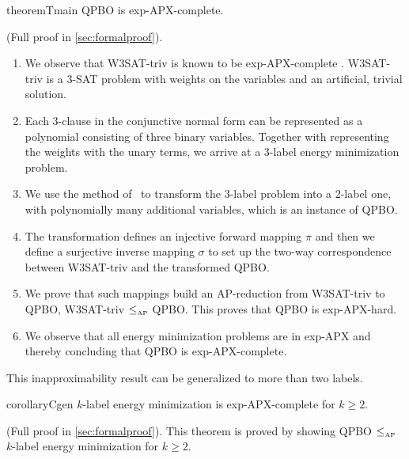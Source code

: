 \begin{restatable}{theorem}{Tmain}\label{th:main}
QPBO is exp-APX-complete.
\end{restatable}
\begin{proofsketch} (Full proof in \cref{sec:formalproof}).
\begin{enumerate}
\item We observe that W3SAT-triv is known to be exp-APX-complete \cite{ausiello1999complexity}. W3SAT-triv is a 3-SAT problem with weights on the variables and an artificial, trivial solution.
\item Each 3-clause in the conjunctive normal form can be represented as a polynomial consisting of three binary variables. Together with representing the weights with the unary terms, we arrive at a 3-label energy minimization problem.
\item We use the method of~\cite{ishikawa2011transformation} to transform the 3-label problem into a 2-label one, with polynomially many additional variables, which is an instance of QPBO.
\item The transformation defines an injective forward mapping $\pi$ and then we define a surjective inverse mapping $\sigma$ to set up the two-way correspondence between W3SAT-triv and the transformed QPBO.
\item We prove that such mappings build an AP-reduction from W3SAT-triv to QPBO, \ie W3SAT-triv $\mathbin{{\leq}_{\text{\tiny AP}}}$ QPBO. This proves that QPBO is exp-APX-hard.
\item We observe that all energy minimization problems are in exp-APX and thereby concluding that QPBO is exp-APX-complete.
\end{enumerate}
\end{proofsketch}

This inapproximability result can be generalized to more than two labels.
\begin{restatable}{corollary}{Cgen}\label{C:gen}
$k$-label energy minimization is exp-APX-complete for $k \geq 2$.
\end{restatable}
%
\begin{proofsketch}
(Full proof in \cref{sec:formalproof}). This theorem is proved by showing QPBO $ \mathbin{{\leq}_{\text{\tiny AP}}}$ $k$-label energy minimization for $k \geq 2$.
\end{proofsketch}

